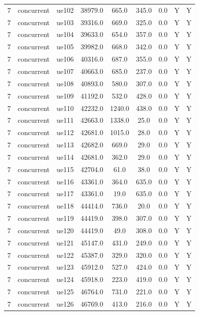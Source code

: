 \begin{table}[ht]
\begin{tabular}{|c|c|c|c|c|c|c|c|c|}
7 & concurrent & ue102 & 38979.0 & 665.0 & 345.0 & 0.0 & Y & Y \\
7 & concurrent & ue103 & 39316.0 & 669.0 & 325.0 & 0.0 & Y & Y \\
7 & concurrent & ue104 & 39633.0 & 654.0 & 357.0 & 0.0 & Y & Y \\
7 & concurrent & ue105 & 39982.0 & 668.0 & 342.0 & 0.0 & Y & Y \\
7 & concurrent & ue106 & 40316.0 & 687.0 & 355.0 & 0.0 & Y & Y \\
7 & concurrent & ue107 & 40663.0 & 685.0 & 237.0 & 0.0 & Y & Y \\
7 & concurrent & ue108 & 40893.0 & 580.0 & 307.0 & 0.0 & Y & Y \\
7 & concurrent & ue109 & 41192.0 & 532.0 & 428.0 & 0.0 & Y & Y \\
7 & concurrent & ue110 & 42232.0 & 1240.0 & 438.0 & 0.0 & Y & Y \\
7 & concurrent & ue111 & 42663.0 & 1338.0 & 25.0 & 0.0 & Y & Y \\
7 & concurrent & ue112 & 42681.0 & 1015.0 & 28.0 & 0.0 & Y & Y \\
7 & concurrent & ue113 & 42682.0 & 669.0 & 29.0 & 0.0 & Y & Y \\
7 & concurrent & ue114 & 42681.0 & 362.0 & 29.0 & 0.0 & Y & Y \\
7 & concurrent & ue115 & 42704.0 & 61.0 & 38.0 & 0.0 & Y & Y \\
7 & concurrent & ue116 & 43361.0 & 364.0 & 635.0 & 0.0 & Y & Y \\
7 & concurrent & ue117 & 43361.0 & 19.0 & 635.0 & 0.0 & Y & Y \\
7 & concurrent & ue118 & 44414.0 & 736.0 & 20.0 & 0.0 & Y & Y \\
7 & concurrent & ue119 & 44419.0 & 398.0 & 307.0 & 0.0 & Y & Y \\
7 & concurrent & ue120 & 44419.0 & 49.0 & 308.0 & 0.0 & Y & Y \\
7 & concurrent & ue121 & 45147.0 & 431.0 & 249.0 & 0.0 & Y & Y \\
7 & concurrent & ue122 & 45387.0 & 329.0 & 320.0 & 0.0 & Y & Y \\
7 & concurrent & ue123 & 45912.0 & 527.0 & 424.0 & 0.0 & Y & Y \\
7 & concurrent & ue124 & 45918.0 & 223.0 & 419.0 & 0.0 & Y & Y \\
7 & concurrent & ue125 & 46764.0 & 731.0 & 221.0 & 0.0 & Y & Y \\
7 & concurrent & ue126 & 46769.0 & 413.0 & 216.0 & 0.0 & Y & Y \\

\end{tabular}
\end{table}
